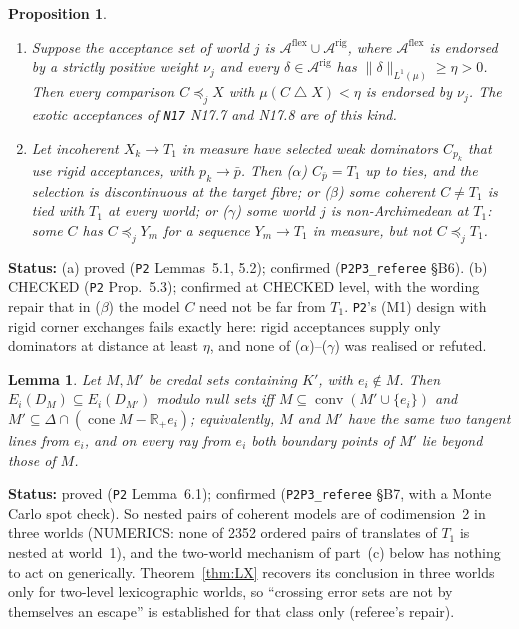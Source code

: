 \documentclass[11pt]{article}
\newtheorem{lemma}[theorem]{Lemma}
\newtheorem{proposition}[theorem]{Proposition}
\theoremstyle{definition}
\theoremstyle{remark}
\newcommand{\R}{\mathbb R}
\newcommand{\co}{\operatorname{conv}}
\newcommand{\sd}{\mathbin{\triangle}}
\newcommand{\src}[1]{\texttt{#1}}
\newcommand{\status}[1]{\par\smallskip\noindent\textbf{Status:} #1\par\smallskip}
\begin{document}
\begin{proposition}\label{prop:rigid}
\begin{enumerate}[leftmargin=*,label=(\alph*)]
\item Suppose the acceptance set of world $j$ is $\mathcal A^{\mathrm{flex}}\cup\mathcal A^{\mathrm{rig}}$, where $\mathcal A^{\mathrm{flex}}$ is endorsed by a strictly positive weight $\nu_j$ and every $\delta\in\mathcal A^{\mathrm{rig}}$ has $\|\delta\|_{L^1(\mu)}\ge\eta>0$. Then every comparison $C\preceq_jX$ with $\mu(C\sd X)<\eta$ is endorsed by $\nu_j$. The exotic acceptances of \src{N17} N17.7 and N17.8 are of this kind.
\item Let incoherent $X_k\to T_1$ in measure have selected weak dominators $C_{p_k}$ that use rigid acceptances, with $p_k\to\bar p$. Then ($\alpha$) $C_{\bar p}=T_1$ up to ties, and the selection is discontinuous at the target fibre; or ($\beta$) some coherent $C\ne T_1$ is tied with $T_1$ at every world; or ($\gamma$) some world $j$ is non-Archimedean at $T_1$: some $C$ has $C\preceq_jY_m$ for a sequence $Y_m\to T_1$ in measure, but not $C\preceq_jT_1$.
\end{enumerate}
\end{proposition}
\status{(a) proved (\src{P2} Lemmas~5.1, 5.2); confirmed (\src{P2P3\_referee} \S B6). (b) CHECKED (\src{P2} Prop.~5.3); confirmed at CHECKED level, with the wording repair that in ($\beta$) the model $C$ need not be far from $T_1$. \src{P2}'s (M1) design with rigid corner exchanges fails exactly here: rigid acceptances supply only dominators at distance at least $\eta$, and none of ($\alpha$)--($\gamma$) was realised or refuted.}

\begin{lemma}\label{lem:nested}
Let $M,M'$ be credal sets containing $K'$, with $e_i\notin M$. Then $E_i(D_M)\subseteq E_i(D_{M'})$ modulo null sets iff $M\subseteq\co(M'\cup\{e_i\})$ and $M'\subseteq\Delta\cap(\operatorname{cone}M-\R_+e_i)$; equivalently, $M$ and $M'$ have the same two tangent lines from $e_i$, and on every ray from $e_i$ both boundary points of $M'$ lie beyond those of $M$.
\end{lemma}
\status{proved (\src{P2} Lemma~6.1); confirmed (\src{P2P3\_referee} \S B7, with a Monte Carlo spot check). So nested pairs of coherent models are of codimension~2 in three worlds (NUMERICS: none of 2352 ordered pairs of translates of $T_1$ is nested at world~1), and the two-world mechanism of part~(c) below has nothing to act on generically. Theorem~\ref{thm:LX} recovers its conclusion in three worlds only for two-level lexicographic worlds, so ``crossing error sets are not by themselves an escape'' is established for that class only (referee's repair).}
\end{document}
